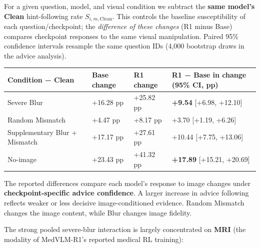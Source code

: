 \documentclass[
  10pt,
  a4paper,
]{article}
\newcounter{none} %
\begin{document}
For a given question, model, and visual condition we subtract the
\textbf{same model's Clean} hint-following rate
\(S_{i,m,\mathrm{Clean}}\). This controls the baseline susceptibility of
each question/checkpoint; the \emph{difference of these changes} (R1
minus Base) compares checkpoint responses to the same visual
manipulation. Paired 95\% confidence intervals resample the same
question IDs (4,000 bootstrap draws in the advice analysis).

{\def\LTcaptype{none} %
\begin{longtable}[]{@{}
  >{\raggedright\arraybackslash}p{}
  >{\raggedleft\arraybackslash}p{}
  >{\raggedleft\arraybackslash}p{}
  >{\raggedleft\arraybackslash}p{}@{}}
\toprule\noalign{}
\begin{minipage}[b]{\linewidth}\raggedright
Condition − Clean
\end{minipage} & \begin{minipage}[b]{\linewidth}\raggedleft
Base change
\end{minipage} & \begin{minipage}[b]{\linewidth}\raggedleft
R1 change
\end{minipage} & \begin{minipage}[b]{\linewidth}\raggedleft
R1 − Base in change (95\% CI, pp)
\end{minipage} \\
\midrule\noalign{}
\endhead
\bottomrule\noalign{}
\endlastfoot
Severe Blur & +16.28 pp & +25.82 pp & \textbf{+9.54} {[}+6.98,
+12.10{]} \\
Random Mismatch & +4.47 pp & +8.17 pp & +3.70 {[}+1.19, +6.26{]} \\
Supplementary Blur + Mismatch & +17.17 pp & +27.61 pp & +10.44 {[}+7.75,
+13.06{]} \\
No-image & +23.43 pp & +41.32 pp & \textbf{+17.89} {[}+15.21,
+20.69{]} \\
\end{longtable}
}

The reported differences compare each model's response to image changes
under \textbf{checkpoint-specific advice confidence}. A larger increase
in advice following reflects weaker or less decisive image-conditioned
evidence. Random Mismatch changes the image content, while Blur changes
image fidelity.

The strong pooled severe-blur interaction is largely concentrated on
\textbf{MRI} (the modality of MedVLM-R1's reported medical RL training):
\end{document}
